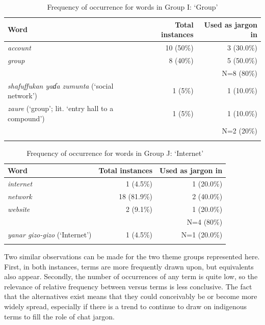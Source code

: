\documentclass[output=paper
,newtxmath
,modfonts
,nonflat]{langsci/langscibook}
\begin{document}
\begin{table}
\begin{tabularx}{\textwidth}{Qrr}
\lsptoprule
Word & Total instances & Used as jargon in \\
\midrule
\textit{account} & 10 (50\%) & 3 (30.0\%)\\
\textit{group}   & 8 (40\%) & 5 (50.0\%)\\\midrule
& & N=8 (80\%)\\\midrule
\textit{shafuffukan yaɗa zumunta} (‘social network’)      & 1 (5\%) & 1 (10.0\%)\\
\textit{zaure} (‘group’; lit. ‘entry hall to a compound’) & 1 (5\%) & 1 (10.0\%)\\\midrule
& & N=2 (20\%)\\
\lspbottomrule
\end{tabularx}
\caption{Frequency of occurrence for words in Group I: ‘Group’}
\label{tab:purvis:11}
\end{table} 

\begin{table}
\begin{tabularx}{\textwidth}{Qrr}
\lsptoprule
Word &  Total instances & Used as jargon in \\
\midrule
\textit{internet} & 1 (4.5\%) & 1 (20.0\%)\\
\textit{network}  & 18 (81.9\%) & 2 (40.0\%)\\
\textit{website}  & 2 (9.1\%) & 1 (20.0\%)\\\midrule
& & N=4 (80\%)\\\midrule
\textit{yanar gizo-gizo} (‘Internet’) & 1 (4.5\%) & N=1 (20.0\%)\\
\lspbottomrule
\end{tabularx}
\caption{Frequency of occurrence for words in Group J: ‘Internet’}
\label{tab:purvis:12}
\end{table} 

Two similar observations can be made for the two theme groups represented here. First, in both instances,  terms are more frequently drawn upon, but  equivalents also appear. Secondly, the number of occurrences of any term is quite low, so the relevance of relative frequency between  versus  terms is less conclusive. The fact that the  alternatives exist means that they could conceivably be or become more widely spread, especially if there is a trend to continue to draw on indigenous terms to fill the role of chat jargon. 
\end{document}
